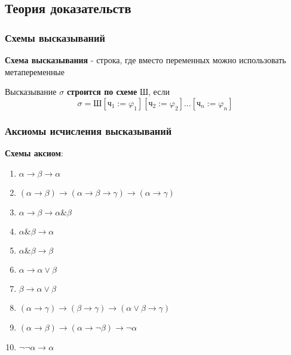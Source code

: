 \subsection{Теория доказательств}

\subsubsection{Схемы высказываний}

\begin{defrus}
\textbf{Схема высказывания} - строка, где вместо переменных можно использовать метапеременные
\end{defrus}


\begin{defrus}
Высказывание $\sigma$ \textbf{строится по схеме} $\textit{Ш}$, если
$$\sigma = \textit{Ш}[\textit{ч}_1 := \varphi_1][\textit{ч}_2 := \varphi_2]...[\textit{ч}_n := \varphi_n]$$
\end{defrus}

\subsubsection{Аксиомы исчисления высказываний}

\begin{defrus}
\textbf{Схемы аксиом}:
\begin{enumerate}
\item $\alpha \rightarrow \beta \rightarrow \alpha$
\item $(\alpha \rightarrow \beta) \rightarrow (\alpha \rightarrow \beta \rightarrow \gamma) \rightarrow (\alpha \rightarrow \gamma)$
\item $\alpha \rightarrow \beta \rightarrow \alpha \& \beta$
\item $\alpha \& \beta \rightarrow \alpha$
\item $\alpha \& \beta \rightarrow \beta$
\item $\alpha \rightarrow \alpha \vee \beta$
\item $\beta \rightarrow \alpha \vee \beta$
\item $(\alpha \rightarrow \gamma) \rightarrow (\beta \rightarrow \gamma) \rightarrow (\alpha \vee \beta \rightarrow \gamma)$
\item $(\alpha \rightarrow \beta) \rightarrow (\alpha \rightarrow \neg \beta) \rightarrow \neg \alpha$
\item $\neg \neg \alpha \rightarrow \alpha$
\end{enumerate}
\end{defrus}

